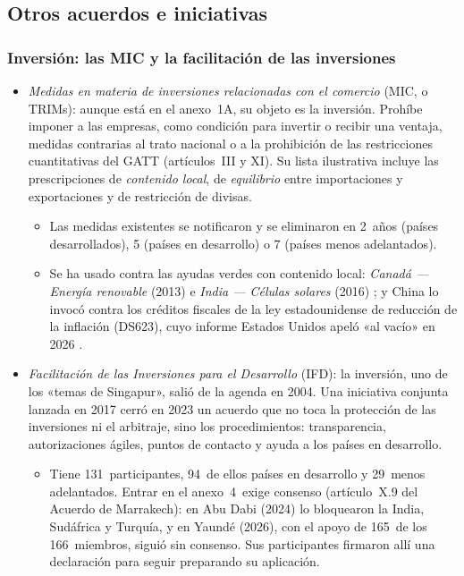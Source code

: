 \documentclass[11pt]{article}
\begin{document}
\subsection{Otros acuerdos e iniciativas}\label{sec:otros-acuerdos}

\subsubsection{Inversión: las MIC y la facilitación de las inversiones}\label{sec:inversion}

\begin{itemize}
\item \emph{Medidas en materia de inversiones relacionadas con el comercio} (MIC, o TRIMs): aunque está en el anexo~1A, su objeto es la inversión. Prohíbe imponer a las empresas, como condición para invertir o recibir una ventaja, medidas contrarias al trato nacional o a la prohibición de las restricciones cuantitativas del GATT (artículos~III y XI). Su lista ilustrativa incluye las prescripciones de \emph{contenido local}, de \emph{equilibrio} entre importaciones y exportaciones y de restricción de divisas\nocite{OMC1994MIC}.
  \begin{itemize}
  \item Las medidas existentes se notificaron y se eliminaron en 2~años (países desarrollados), 5 (países en desarrollo) o 7 (países menos adelantados).
  \item Se ha usado contra las ayudas verdes con contenido local: \emph{Canadá — Energía renovable} (2013) e \emph{India — Células solares} (2016) ; y China lo invocó contra los créditos fiscales de la ley estadounidense de reducción de la inflación (DS623), cuyo informe Estados Unidos apeló «al vacío» en 2026 .
  \end{itemize}
\item \emph{Facilitación de las Inversiones para el Desarrollo} (IFD): la inversión, uno de los «temas de Singapur», salió de la agenda en 2004. Una iniciativa conjunta lanzada en 2017 cerró en 2023 un acuerdo que no toca la protección de las inversiones ni el arbitraje, sino los procedimientos: transparencia, autorizaciones ágiles, puntos de contacto y ayuda a los países en desarrollo\nocite{OMC2026IFD}.
  \begin{itemize}
  \item Tiene 131~participantes, 94~de ellos países en desarrollo y 29~menos adelantados. Entrar en el anexo~4~exige consenso (artículo~X.9 del Acuerdo de Marrakech): en Abu Dabi (2024) lo bloquearon la India, Sudáfrica y Turquía, y en Yaundé (2026), con el apoyo de 165~de los 166~miembros, siguió sin consenso. Sus participantes firmaron allí una declaración para seguir preparando su aplicación\nocite{OMC2026IFD}.
  \end{itemize}
\end{itemize}
\end{document}

